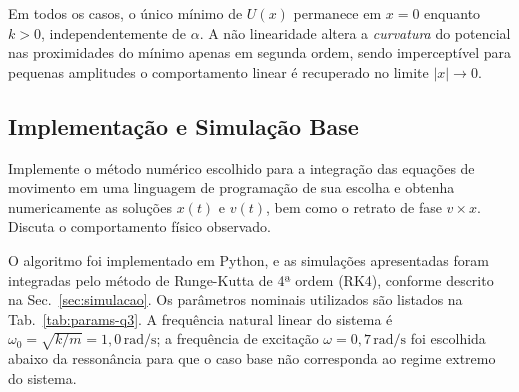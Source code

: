 Em todos os casos, o único mínimo de $U(x)$ permanece em $x = 0$ enquanto $k > 0$, independentemente de $\alpha$. A não linearidade altera a \emph{curvatura} do potencial nas proximidades do mínimo apenas em segunda ordem, sendo imperceptível para pequenas amplitudes o comportamento linear é recuperado no limite $|x| \to 0$.

\subsection{Implementação e Simulação Base}

\begin{questao}
 Implemente o método numérico escolhido para a integração das equações de movimento em uma
linguagem de programação de sua escolha e obtenha numericamente as soluções $x(t)$ e $v(t)$, bem como o retrato de fase $v \times x$. Discuta o comportamento físico observado.
\end{questao}

O algoritmo foi implementado em Python, e as simulações apresentadas foram integradas pelo método de Runge-Kutta de 4ª ordem (RK4), conforme descrito na Sec.~\ref{sec:simulacao}. Os parâmetros nominais utilizados são listados na Tab.~\ref{tab:params-q3}. A frequência natural linear do sistema é $\omega_0 = \sqrt{k/m} = 1{,}0\,\text{rad/s}$; a frequência de excitação $\omega = 0{,}7\,\text{rad/s}$ foi escolhida abaixo da ressonância para que o caso base não corresponda ao regime extremo do sistema.

